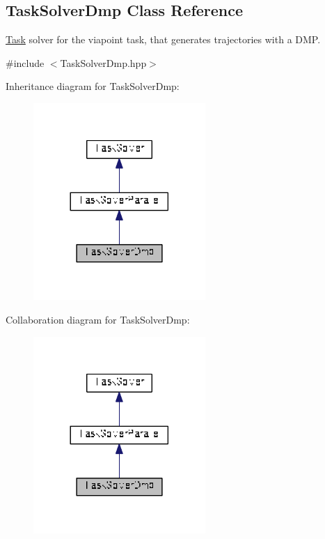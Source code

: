 \hypertarget{classDmpBbo_1_1TaskSolverDmp}{\subsection{Task\+Solver\+Dmp Class Reference}
\label{classDmpBbo_1_1TaskSolverDmp}
}


\hyperlink{classDmpBbo_1_1Task}{Task} solver for the viapoint task, that generates trajectories with a D\+M\+P.  




{\ttfamily \#include $<$Task\+Solver\+Dmp.\+hpp$>$}



Inheritance diagram for Task\+Solver\+Dmp\+:
\nopagebreak
\begin{figure}[H]
\begin{center}
\leavevmode
\includegraphics[width=185pt]{classDmpBbo_1_1TaskSolverDmp__inherit__graph}
\end{center}
\end{figure}


Collaboration diagram for Task\+Solver\+Dmp\+:
\nopagebreak
\begin{figure}[H]
\begin{center}
\leavevmode
\includegraphics[width=185pt]{classDmpBbo_1_1TaskSolverDmp__coll__graph}
\end{center}
\end{figure}
